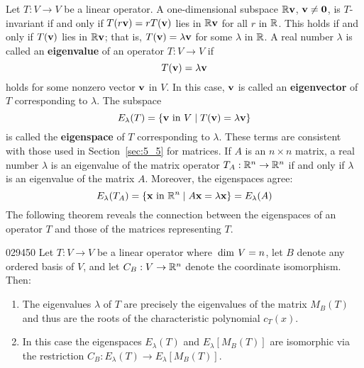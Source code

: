 Let $T : V \to V$ be a linear operator. A one-dimensional subspace $\mathbb{R}\textbf{v}$, $\textbf{v} \neq \textbf{0}$, is $T$-invariant if and only if $T(r\textbf{v}) = rT(\textbf{v})$ lies in $\mathbb{R}\textbf{v}$ for all $r$ in $\mathbb{R}$. This holds if and only if $T(\textbf{v})$ lies in $\mathbb{R}\textbf{v}$; that is, $T(\textbf{v}) = \lambda\textbf{v}$ for some $\lambda$ in $\mathbb{R}$. A real number $\lambda$ is called an \textbf{eigenvalue} of an operator $T : V \to V$ if
\begin{equation*}
T(\textbf{v}) = \lambda\textbf{v}
\end{equation*}
holds for some nonzero vector $\textbf{v}$ in $V$. In this case, $\textbf{v}$ is called an \textbf{eigenvector} of $T$ corresponding to $\lambda$. The subspace
\begin{equation*}
E_{\lambda}(T) = \{\textbf{v} \mbox{ in } V \mid T(\textbf{v}) = \lambda\textbf{v}\}
\end{equation*}
is called the \textbf{eigenspace} of $T$ corresponding to $\lambda$. These terms are consistent with those used in Section~\ref{sec:5_5} for matrices. If $A$ is an $n \times n$ matrix, a real number $\lambda$ is an eigenvalue of the matrix operator $T_{A} : \mathbb{R}^n \to \mathbb{R}^n$ if and only if $\lambda$ is an eigenvalue of the matrix $A$. Moreover, the eigenspaces agree:
\begin{equation*}
E_{\lambda}(T_A) = \{\textbf{x} \mbox{ in } \mathbb{R}^n \mid A\textbf{x} = \lambda\textbf{x} \} = E_{\lambda}(A)
\end{equation*}
The following theorem reveals the connection between the eigenspaces of an operator $T$ and those of the matrices representing $T$.


\begin{theorem}{}{029450}
Let $T : V \to V$ be a linear operator where $\thinspace\operatorname{dim \medspace}V = n$, let $B$ denote any ordered basis of $V$, and let $C_{B} : V \to \mathbb{R}^n$ denote the coordinate isomorphism. Then:


\begin{enumerate}
\item The eigenvalues $\lambda$ of $T$ are precisely the eigenvalues of the matrix $M_{B}(T)$ and thus are the roots of the characteristic polynomial $c_{T}(x)$.

\item In this case the eigenspaces $E_{\lambda}(T)$ and $E_{\lambda}[M_{B}(T)]$ are isomorphic via the restriction $C_{B} : E_{\lambda}(T) \to E_{\lambda}[M_{B}(T)]$.

\end{enumerate}
\end{theorem}

